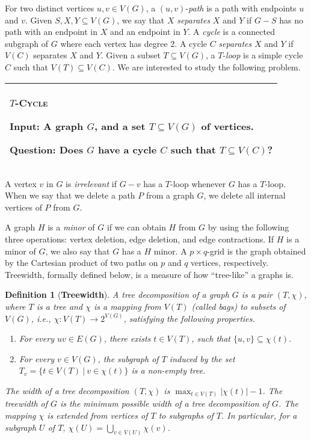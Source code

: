 \documentclass{article}
\newtheorem{definition}[theorem]{Definition}
\numberwithin{claimcounter}{lemma}
\newcommand{\tcycle}{$T$-\textsc{Cycle}\xspace}
\newcommand{\Pb}[4]{\begin{center}
  \begin{tabular}{|l|}\hline
    \begin{minipage}[c]{0.95\textwidth}
      \smallskip \par\noindent #1\par\noindent \textbf{\textsf{Input}}: #2\par\noindent \textbf{\textsf{#3}}: #4 
      \smallskip \par\noindent \end{minipage}
  \\\hline
  \end{tabular}\end{center}
}
\begin{document}
For two distinct vertices $u,v\in V(G)$, a $(u,v)$-\textit{path} is a path with endpoints $u$ and $v$. Given $S,X,Y\subseteq V(G)$, we say that $X$ \textit{separates} $X$ and $Y$ if $G-S$ has no path with an endpoint in $X$ and an endpoint in $Y$. A \textit{cycle} is a connected subgraph of $G$ where each vertex has degree 2. A cycle $C$ \textit{separates} $X$ and $Y$ if $V(C)$ separates $X$ and $Y$. 
Given a subset $T\subseteq V(G)$, a $T$-\textit{loop} is a simple cycle $C$ such that $V(T)\subseteq V(C)$. We are interested to study the following problem.






\Pb{\tcycle}{A graph $G$, and a set $T \subseteq V(G)$ of vertices.}{Question}{Does $G$ have a cycle $C$ such that $T\subseteq V(C)$?}
A vertex $v$ in $G$ is \textit{irrelevant} if $G-v$ has a $T$-loop whenever $G$ has a $T$-loop. When we say that we delete a path $P$ from a graph $G$, we delete all internal vertices of $P$ from $G$.


A graph $H$ is a \textit{minor} of $G$ if we can obtain $H$ from $G$ by using the following three operations: vertex deletion, edge deletion, and edge contractions. If $H$ is a minor of $G$, we also say that $G$ has a $H$ minor. A $p\times q$-grid is the graph obtained by the Cartesian product of two paths on $p$ and $q$ vertices, respectively. Treewidth, formally defined below, is a measure of how ``tree-like'' a graphs is.

\begin{definition}[{\bf Treewidth}]\label{D:tw}
 A \emph{tree decomposition} of a graph $G$ is a pair $(T,\chi)$, where $T$ is a tree and $\chi$ is a mapping from $V(T)$ (called \emph{bags}) to subsets of $V(G)$, i.e., $\chi: V(T) \rightarrow 2^{V(G)}$, satisfying the following properties. 
\begin{enumerate}
    \item For every $uv \in E(G)$, there exists $t\in V(T)$, such that $\{u,v\} \subseteq \chi(t)$.
    \item For every $v \in V(G)$, the subgraph of $T$ induced by the set $T_v = \{ t \in V(T)~|~v \in \chi(t)\}$ is a non-empty tree.
\end{enumerate}

\noindent The \emph{width} of a tree decomposition $(T,\chi)$ is $\max_{t\in V(T)} |\chi(t)| - 1$. The \emph{treewidth} of $G$ is the minimum possible width of a tree decomposition of $G$. The mapping $\chi$ is extended from vertices of $T$ to subgraphs of $T$. In particular, for a subgraph $U$  of $T$,  $\chi(U) = \bigcup_{v\in V(U)} \chi(v)$.
\end{definition}
\end{document}
